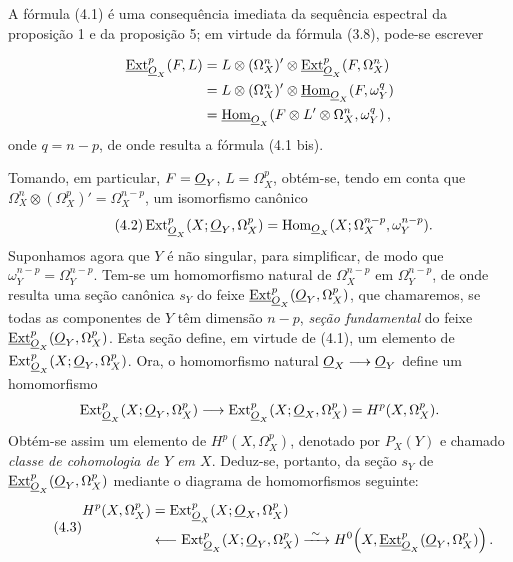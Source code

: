A fórmula (4.1) é uma consequência imediata da sequência espectral da
proposição 1 e da proposição 5; em virtude da fórmula (3.8), pode-se
escrever

\begin{align*}
\underline{\operatorname{Ext}}_{\underline{O}_X}^{p}(F,L)
&=L\otimes(\Omega_X^{n})'\otimes
  \underline{\operatorname{Ext}}_{\underline{O}_X}^{p}(F,\Omega_X^{n})\\
&=L\otimes(\Omega_X^{n})'\otimes
  \underline{\operatorname{Hom}}_{\underline{O}_X}(F,\omega_Y^{q})\\
&=\underline{\operatorname{Hom}}_{\underline{O}_X}\!\left(
  F\otimes L'\otimes\Omega_X^{n},\omega_Y^{q}\right),
\end{align*}
onde $q=n-p$, de onde resulta a fórmula (4.1 bis).

Tomando, em particular, $F=\underline{O}_Y$, $L=\Omega_X^{p}$, obtém-se, tendo em conta
que $\Omega_X^{n}\otimes(\Omega_X^{p})'=\Omega_X^{n-p}$, um isomorfismo
canônico
\begin{equation}\tag{4.2}
  \operatorname{Ext}_{\underline{O}_X}^{p}(X;\underline{O}_Y,\Omega_X^{p})
  =\operatorname{Hom}_{\underline{O}_X}
  (X;\Omega_X^{n-p},\omega_Y^{n-p}).
\end{equation}
Suponhamos agora que $Y$ é não singular, para simplificar, de modo que
$\omega_Y^{n-p}=\Omega_Y^{n-p}$. Tem-se um homomorfismo natural de
$\Omega_X^{n-p}$ em $\Omega_Y^{n-p}$, de onde resulta uma seção canônica $s_Y$ do
feixe $\underline{\operatorname{Ext}}_{\underline{O}_X}^{p}(\underline{O}_Y,\Omega_X^{p})$, que chamaremos, se
todas as componentes de $Y$ têm dimensão $n-p$, \emph{seção
fundamental} do feixe $\underline{\operatorname{Ext}}_{\underline{O}_X}^{p}(\underline{O}_Y,\Omega_X^{p})$. Esta
seção define, em virtude de (4.1), um elemento de
$\operatorname{Ext}_{\underline{O}_X}^{p}(X;\underline{O}_Y,\Omega_X^{p})$. Ora, o homomorfismo
natural $\underline{O}_X\longrightarrow\underline{O}_Y$ define um homomorfismo
\[
  \operatorname{Ext}_{\underline{O}_X}^{p}(X;\underline{O}_Y,\Omega_X^{p})
  \longrightarrow
  \operatorname{Ext}_{\underline{O}_X}^{p}(X;\underline{O}_X,\Omega_X^{p})
  =H^{p}(X,\Omega_X^{p}).
\]
Obtém-se assim um elemento de $H^{p}(X,\Omega_X^{p})$, denotado por $P_X(Y)$ e chamado
\emph{classe de cohomologia de $Y$ em $X$}. Deduz-se, portanto, da seção
$s_Y$ de $\underline{\operatorname{Ext}}_{\underline{O}_X}^{p}(\underline{O}_Y,\Omega_X^{p})$ mediante o diagrama
de homomorfismos seguinte:
\begin{equation}\tag{4.3}
\begin{aligned}
H^{p}(X,\Omega_X^{p})
&=\operatorname{Ext}_{\underline{O}_X}^{p}(X;\underline{O}_X,\Omega_X^{p})\\
&\longleftarrow\operatorname{Ext}_{\underline{O}_X}^{p}(X;\underline{O}_Y,\Omega_X^{p})
\xrightarrow{\ \sim\ }
H^{0}\!\left(X,\underline{\operatorname{Ext}}_{\underline{O}_X}^{p}(\underline{O}_Y,\Omega_X^{p})\right).
\end{aligned}
\end{equation}

